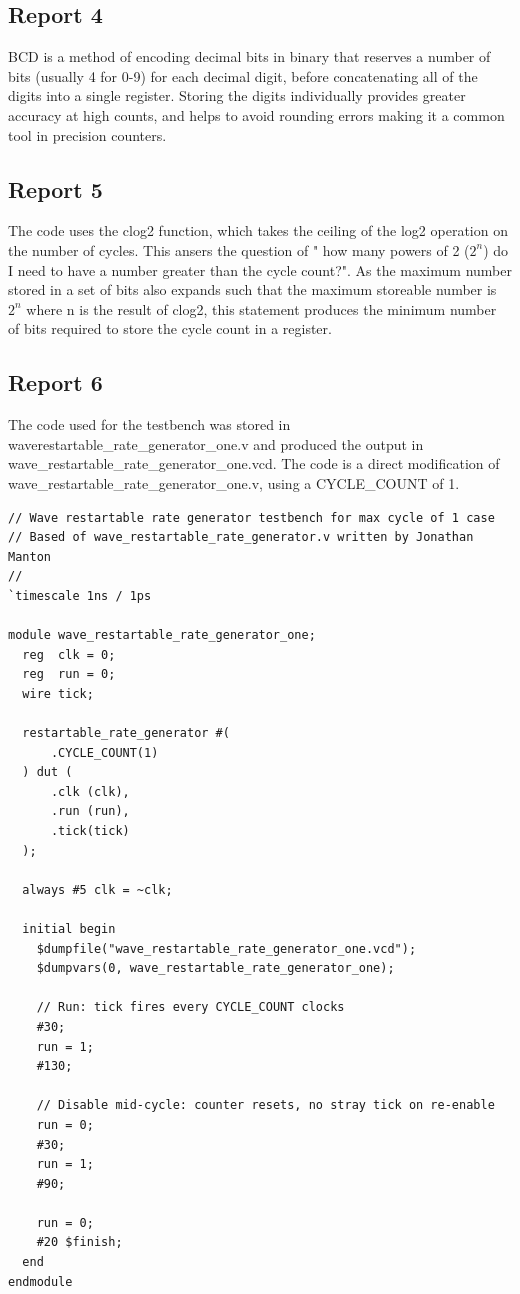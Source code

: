 \documentclass{report}
\begin{document}
\subsection{Report 4}
BCD is a method of encoding decimal bits in binary that reserves a 
number of bits (usually 4 for 0-9) for each decimal digit, before 
concatenating all of the digits into a single register. Storing the 
digits individually provides greater accuracy at high counts, and helps 
to avoid rounding errors making it a common tool in precision counters.

\subsection{Report 5}
The code uses the clog2 function, which takes the ceiling of the log2
operation on the number of cycles. This ansers the question of " how
many powers of 2 ($2^n$) do I need to have a number greater than the cycle
count?". As the maximum number stored in a set of bits also expands
such that the maximum storeable number is $2^n$ where n is the result
of clog2, this statement produces the minimum number of bits required 
to store the cycle count in a register.

\subsection{Report 6}
The code used for the testbench was stored in 
waverestartable\_rate\_generator\_one.v and produced the output in
wave\_restartable\_rate\_generator\_one.vcd. The code is a direct
modification of wave\_restartable\_rate\_generator\_one.v, using
a CYCLE\_COUNT of 1.

\begin{verbatim}
// Wave restartable rate generator testbench for max cycle of 1 case
// Based of wave_restartable_rate_generator.v written by Jonathan Manton
//
`timescale 1ns / 1ps

module wave_restartable_rate_generator_one;
  reg  clk = 0;
  reg  run = 0;
  wire tick;

  restartable_rate_generator #(
      .CYCLE_COUNT(1)
  ) dut (
      .clk (clk),
      .run (run),
      .tick(tick)
  );

  always #5 clk = ~clk;

  initial begin
    $dumpfile("wave_restartable_rate_generator_one.vcd");
    $dumpvars(0, wave_restartable_rate_generator_one);

    // Run: tick fires every CYCLE_COUNT clocks
    #30;
    run = 1;
    #130;

    // Disable mid-cycle: counter resets, no stray tick on re-enable
    run = 0;
    #30;
    run = 1;
    #90;

    run = 0;
    #20 $finish;
  end
endmodule
\end{verbatim}
\end{document}
